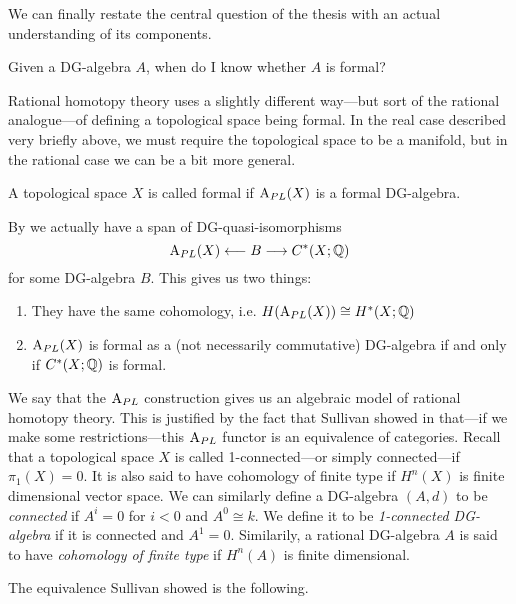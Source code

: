 We can finally restate the central question of the thesis with an actual understanding of its components.
\begin{central}
Given a DG-algebra $A$, when do I know whether $A$ is formal? 
\end{central}

Rational homotopy theory uses a slightly different way---but sort of the rational analogue---of defining a topological space being formal. In the real case described very briefly above, we must require the topological space to be a manifold, but in the rational case we can be a bit more general. 


\begin{definition}
\label{def:formal_space}
A topological space $X$ is called formal if $\text{A}_{PL}(X)$ is a formal DG-algebra. 
\end{definition}

By \cite[Corollary 10.10]{FHT} we actually have a span of DG-quasi-isomorphisms 
\begin{equation*}
    \text{A}_{PL}(X)\longleftarrow B \longrightarrow C^*(X;\mathbb{Q})
\end{equation*}
for some DG-algebra $B$. This gives us two things:
\begin{enumerate}
    \item They have the same cohomology, i.e. $H(\text{A}_{PL}(X)) \cong H^*(X;\mathbb{Q})$
    \item $\text{A}_{PL}(X)$ is formal as a (not necessarily commutative) DG-algebra if and only if $C^*(X;\mathbb{Q})$ is formal. 
\end{enumerate}

We say that the $\text{A}_{PL}$ construction gives us an algebraic model of rational homotopy theory. This is justified by the fact that Sullivan showed in \cite{Sullivan} that---if we make some restrictions---this $\text{A}_{PL}$ functor is an equivalence of categories. Recall that a topological space $X$ is called 1-connected---or simply connected---if $\pi_1(X)=0$. It is also said to have cohomology of finite type if $H^n(X)$ is finite dimensional vector space. We can similarly define a DG-algebra $(A, d)$ to be \emph{connected} if $A^i = 0$ for $i< 0$ and $A^0\cong k$. We define it to be \emph{1-connected DG-algebra} if it is connected and $A^1=0$. Similarily, a rational DG-algebra $A$ is said to have \emph{cohomology of finite type} if $H^n(A)$ is finite dimensional. 

The equivalence Sullivan showed is the following.

